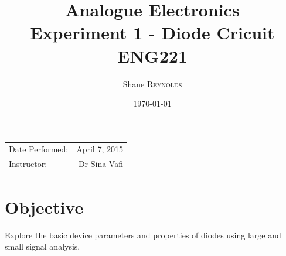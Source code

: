 \documentclass{article}
\title{Analogue Electronics \\ Experiment 1 - Diode Cricuit \\ ENG221} %
\author{Shane \textsc{Reynolds}} %
\date{\today} %
\begin{document}
\maketitle %

\begin{center}
\begin{tabular}{l r}
Date Performed: & April 7, 2015 \\ %
Instructor: & Dr Sina Vafi %
\end{tabular}
\end{center}



\section{Objective}

Explore the basic device parameters and properties of diodes using large and small signal analysis.
\end{document}
